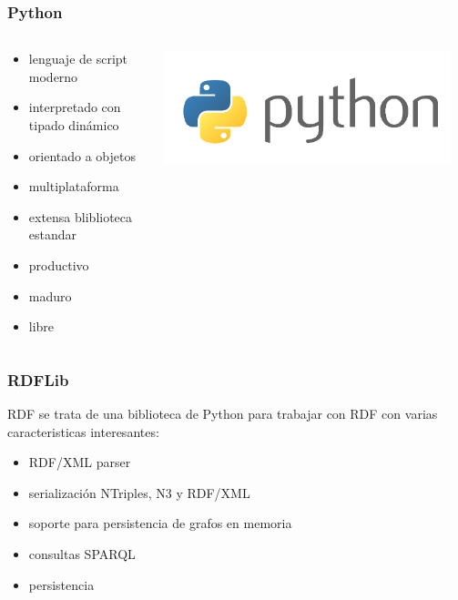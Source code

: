 \documentclass[spanish,notes=hide]{beamer}
\begin{document}
{
  \frametitle{Python}

  \begin{columns}
   \begin{column}{0.6\textwidth}
      \begin{itemize}
	 \item lenguaje de script moderno
	 \item interpretado con tipado dinámico
	 \item orientado a objetos
	 \item multiplataforma
	 \item extensa bliblioteca estandar
	 \item productivo
	 \item maduro
	 \item libre
      \end{itemize}
   \end{column}
   \begin{column}{0.4\textwidth}
	\includegraphics[width=0.95\textwidth]{images/python.png}
   \end{column}
  \end{columns}
}
\frame
{
  \frametitle{RDFLib}

  RDF se trata de una biblioteca de Python para trabajar con RDF con varias caracteristicas interesantes:

  \begin{itemize}
   \item RDF/XML parser
   \item serialización NTriples, N3 y RDF/XML
   \item soporte para persistencia de grafos en memoria
   \item consultas SPARQL
   \item persistencia
  \end{itemize}

}
\end{document}

